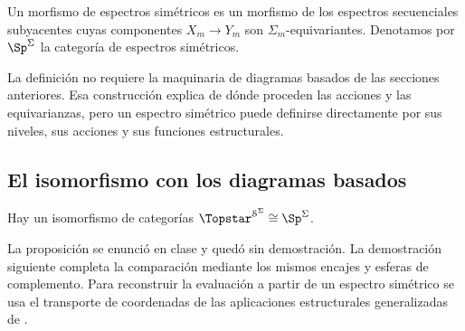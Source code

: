 \begin{defi}
Un morfismo de espectros simétricos es un morfismo de los espectros secuenciales subyacentes cuyas componentes $X_m\to Y_m$ son $\Sigma_m$-equivariantes. Denotamos por $\Sp^\Sigma$ la categoría de espectros simétricos.
\end{defi}

\begin{nota}
La definición no requiere la maquinaria de diagramas basados de las secciones anteriores. Esa construcción explica de dónde proceden las acciones y las equivarianzas, pero un espectro simétrico puede definirse directamente por sus niveles, sus acciones y sus funciones estructurales.
\end{nota}

\subsection{El isomorfismo con los diagramas basados}

\begin{samepage}
\begin{prop}\label{prop:c27-simetricos-diagramas}
Hay un isomorfismo de categorías $\Topstar^{\mathcal S^\Sigma}\cong\Sp^\Sigma$.
\end{prop}

\begin{nota}
La proposición se enunció en clase y quedó sin demostración. La demostración siguiente completa la comparación mediante los mismos encajes y esferas de complemento. Para reconstruir la evaluación a partir de un espectro simétrico se usa el transporte de coordenadas de las aplicaciones estructurales generalizadas de \cite[definición~1.9]{hausmann2019}.
\end{nota}
\end{samepage}

